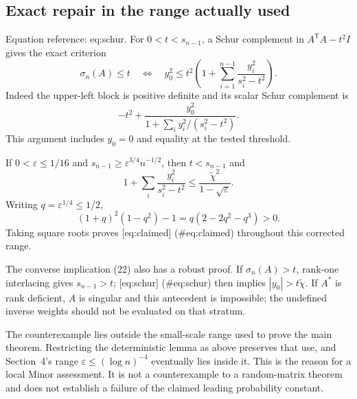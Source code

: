\documentclass[10pt]{article}
\begin{document}
\subsection*{Exact repair in the range actually used}
Equation reference: eq:schur. For \(0<t<s_{n-1}\), a Schur complement in \(A^{\mathsf T}A-t^2I\) gives the exact criterion \[\sigma_n(A)\leq t
 \quad\Longleftrightarrow\quad
 y_0^2\leq t^2\left(1+\sum_{i=1}^{n-1}
                  \frac{y_i^2}{s_i^2-t^2}\right).
 \] Indeed the upper-left block is positive definite and its scalar Schur complement is \[-t^2+\frac{y_0^2}{1+\sum_i y_i^2/(s_i^2-t^2)}.\] This argument includes \(y_0=0\) and equality at the tested threshold.\par
If \(0<\varepsilon\leq1/16\) and \(s_{n-1}\geq\varepsilon^{3/4}n^{-1/2}\), then \(t<s_{n-1}\) and \[1+\sum_i\frac{y_i^2}{s_i^2-t^2}
 \leq \frac{\widetilde\chi^2}{1-\sqrt\varepsilon}.\] Writing \(q=\varepsilon^{1/4}\leq1/2\), \[(1+q)^2(1-q^2)-1=q(2-2q^2-q^3)>0.\] Taking square roots proves [eq:claimed] (\#eq:claimed) throughout this corrected range.\par
The converse implication (22) also has a robust proof. If \(\sigma_n(A)>t\), rank-one interlacing gives \(s_{n-1}>t\); [eq:schur] (\#eq:schur) then implies \(|y_0|>t\widetilde\chi\). If \(A^*\) is rank deficient, \(A\) is singular and this antecedent is impossible; the undefined inverse weights should not be evaluated on that stratum.\par
The counterexample lies outside the small-scale range used to prove the main theorem. Restricting the deterministic lemma as above preserves that use, and Section 4’s range \(\varepsilon\leq(\log n)^{-4}\) eventually lies inside it. This is the reason for a local Minor assessment. It is not a counterexample to a random-matrix theorem and does not establish a failure of the claimed leading probability constant.\par
\end{document}
